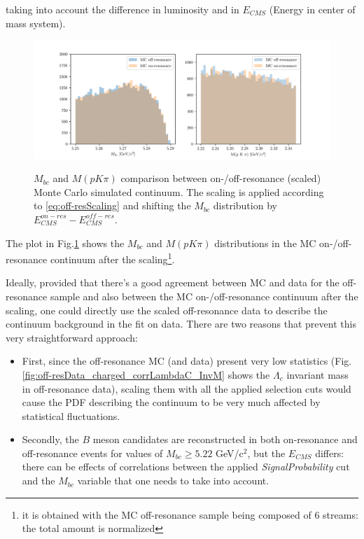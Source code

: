 \noindent taking into account the difference in luminosity and in $E_{CMS}$ (Energy in center of mass system).


\begin{figure}[h!]
{\includegraphics[width=1.05\textwidth]{04-SimultaneousFit/figs/MbcInvM_MC_on_off-resonance_comparison.png}}
\caption{$M_{bc}$ and $M(p K \pi)$ comparison between  on-/off-resonance (scaled) Monte Carlo simulated continuum. The scaling is applied according to \cref{eq:off-resScaling} and shifting the $M_{bc}$ distribution by $E^{on-res}_{CMS} - E^{off-res}_{CMS}$. }
\label{fig:MbcInvM_MC_on_off-resonance_comparison}
\end{figure} 

\noindent The plot in Fig.\ref{fig:MbcInvM_MC_on_off-resonance_comparison} shows the $M_{bc}$ and $M(p K \pi)$ distributions in the MC on-/off-resonance continuum after the scaling\footnote{it is obtained with the MC off-resonance sample being composed of 6 streams: the total amount is normalized}.

Ideally, provided that there's a good agreement between MC and data for the off-resonance sample and also between the MC  on-/off-resonance continuum after the scaling, one could directly use the scaled off-resonance data to describe the continuum background in the fit on data. There are two reasons that prevent this very straightforward approach:
\begin{itemize}

\item First, since the off-resonance MC (and data) present very low statistics (Fig. \ref{fig:off-resData_charged_corrLambdaC_InvM} shows the  $\Lambda_c$ 
invariant mass in off-resonance data), scaling them with all the applied selection cuts would cause the PDF describing the continuum to be very much affected by statistical fluctuations. 
\item Secondly, the $B$ meson candidates are reconstructed in both on-resonance and off-resonance events for values of $M_{bc} \geq 5.22 $ GeV/c$^2$, but the $E_{CMS}$ differs: there can be effects of correlations between the applied \textit{SignalProbability} cut and the $M_{bc}$ variable that one needs to take into account. %
\end{itemize}


